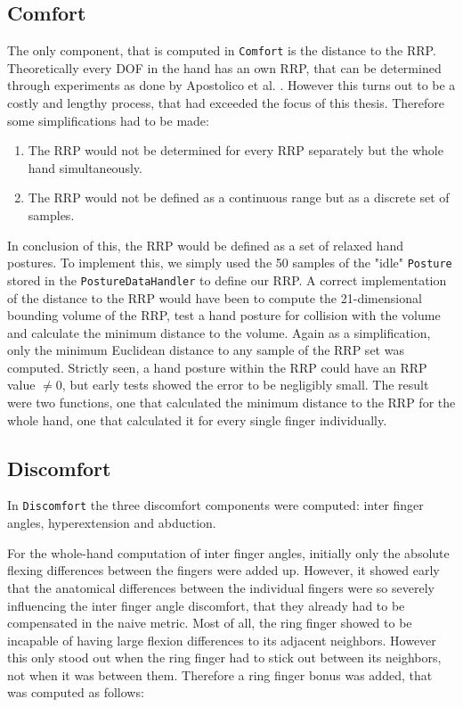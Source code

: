 \subsection{Comfort}

The only component, that is computed in \texttt{Comfort} is the distance to the RRP. Theoretically every DOF in the hand has an own RRP, that can be determined through experiments as done by Apostolico et al. \cite{apostolico2014postural}. However this turns out to be a costly and lengthy process, that had exceeded the focus of this thesis. Therefore some simplifications had to be made:

\begin{enumerate}
	\item The RRP would not be determined for every RRP separately but the whole hand simultaneously.
	\item The RRP would not be defined as a continuous range but as a discrete set of samples.
\end{enumerate}

In conclusion of this, the RRP would be defined as a set of relaxed hand postures. To implement this, we simply used the 50 samples of the "idle" \texttt{Posture} stored in the \texttt{PostureDataHandler} to define our RRP. A correct implementation of the distance to the RRP would have been to compute the 21-dimensional bounding volume of the RRP, test a hand posture for collision with the volume and calculate the minimum distance to the volume. Again as a simplification, only the minimum Euclidean distance to any sample of the RRP set was computed. Strictly seen, a hand posture within the RRP could have an RRP value \begin{math}\not= 0\end{math}, 
but early tests showed the error to be negligibly small.
The result were two functions, one that calculated the minimum distance to the RRP for the whole hand, one that calculated it for every single finger individually.

\subsection{Discomfort}

In \texttt{Discomfort} the three discomfort components were computed: inter finger angles, hyperextension and abduction.

For the whole-hand computation of inter finger angles, initially only the absolute flexing differences between the fingers were added up. However, it showed early that the anatomical differences between the individual fingers were so severely influencing the inter finger angle discomfort, that they already had to be compensated in the naive metric. Most of all, the ring finger showed to be incapable of having large flexion differences to its adjacent neighbors. However this only stood out when the ring finger had to stick out between its neighbors, not when it was between them. Therefore a ring finger bonus was added, that was computed as follows: 

